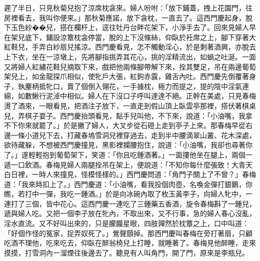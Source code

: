 遲了半日，只見秋菊兒抱了涼席枕衾來。婦人吩咐：「放下鋪蓋，拽上花園門，往房裡看去，我叫你便來。」那秋菊應諾，放下衾枕，一直去了。這西門慶起身，脫下玉色紗��兒，搭在欄杆上，逕往牡丹台畔花架下，小淨手去了。回來見婦人早在架兒底下，鋪設涼簟枕衾停當，脫的上下沒條絲，仰臥於衽席之上，腳下穿著大紅鞋兒，手弄白紗扇兒搖涼。西門慶看見，怎不觸動淫心，於是剩著酒興，亦脫去上下衣，坐在一涼墩上，先將腳指挑弄其花心，挑的淫精流出，如蝸之吐涎。一面又將婦人紅繡花鞋兒摘取下來，戲把他兩條腳帶解下來，拴其雙足，吊在兩邊葡萄架兒上，如金龍探爪相似，使牝戶大張，紅鉤赤露，雞舌內吐。西門慶先倒覆著身子，執麈柄抵牝口，賣了個倒入翎花，一手據枕，極力而提之，提的陰中淫氣連綿，如數鰍行泥淖中相似。婦人在下沒口子呼叫達達不絕。正幹在美處，只見春梅燙了酒來，一眼看見，把酒注子放下，一直走到假山頂上臥雲亭那裡，搭伏著棋桌兒，弄棋子耍子。西門慶抬頭看見，點手兒叫他，不下來，說道：「小油嘴，我拿不下你來就罷了。」於是撇了婦人，大叉步從石磴上走到亭子上來。那春梅早從右邊一條小道兒下去，打藏春塢雪洞兒裡穿過去，走到半中腰滴翠山叢、花木深處，欲待藏躲，不想被西門慶撞見，黑影裡攔腰抱住，說道：「小油嘴，我卻也尋著你了。」遂輕輕抱到葡萄架下，笑道：「你且吃鍾酒著。」一面摟他坐在腿上，兩個一遞一口飲酒。春梅見婦人兩腿拴吊在架上，便說道：「不知你每什麼張致！大青天白日裡，一時人來撞見，怪模怪樣的。」西門慶問道：「角門子關上了不曾？」春梅道：「我來時扣上了。」西門慶道：「小油嘴，看我投個肉壺，名喚金彈打銀鵝，你瞧，若打中一彈，我吃一鍾酒。」於是向冰碗內取了枚玉黃李子，向婦人牝中，一連打了三個，皆中花心。這西門慶一連吃了三鍾藥五香酒，旋令春梅斟了一鍾兒，遞與婦人吃。又把一個李子放在牝內，不取出來，又不行事，急的婦人春心沒亂，淫水直流。又不好叫出來的，只是朦朧星眼，四肢嚲然於枕簟之上，口中叫道：「好個作怪的冤家，捉弄奴死了。」鶯聲顫掉。那西門慶叫春梅在旁打著扇，只顧吃酒不理他，吃來吃去，仰臥在醉翁椅兒上打睡，就睡著了。春梅見他醉睡，走來摸摸，打雪洞內一溜煙往後邊去了。聽見有人叫角門，開了門，原來是李瓶兒。

